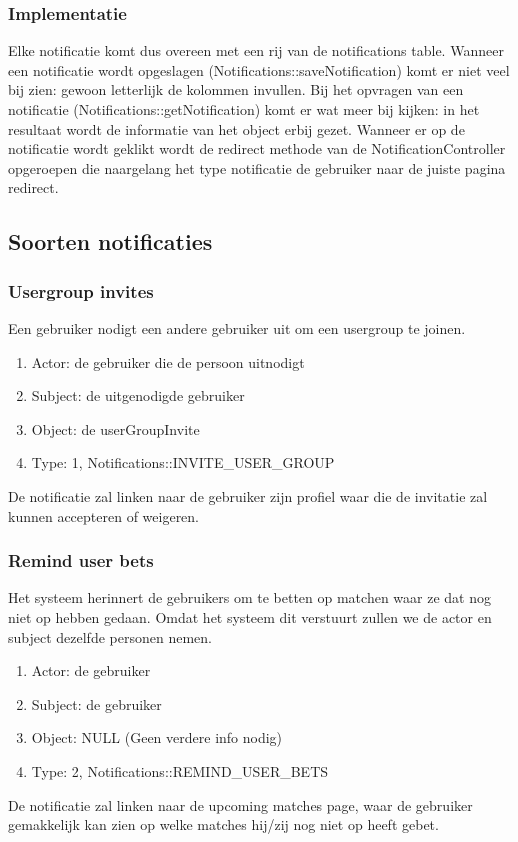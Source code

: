 \documentclass[11pt, a4paper]{article}
\begin{document}
\subsubsection{Implementatie}
Elke notificatie komt dus overeen met een rij van de notifications table. Wanneer een notificatie wordt opgeslagen (Notifications::saveNotification) komt er niet veel bij zien: gewoon letterlijk de kolommen invullen.
Bij het opvragen van een notificatie (Notifications::getNotification) komt er wat meer bij kijken: in het resultaat wordt de informatie van het object erbij gezet.
Wanneer er op de notificatie wordt geklikt wordt de redirect methode van de NotificationController opgeroepen die naargelang het type notificatie de gebruiker naar de juiste pagina redirect.

\subsection{Soorten notificaties}
\subsubsection{Usergroup invites}
Een gebruiker nodigt een andere gebruiker uit om een usergroup te joinen.
\begin{enumerate}
\item Actor: de gebruiker die de persoon uitnodigt
\item Subject: de uitgenodigde gebruiker
\item Object: de userGroupInvite
\item Type: 1, Notifications::INVITE_USER_GROUP
\end{enumerate}
De notificatie zal linken naar de gebruiker zijn profiel waar die de invitatie zal kunnen accepteren of weigeren.

\subsubsection{Remind user bets}
Het systeem herinnert de gebruikers om te betten op matchen waar ze dat nog niet op hebben gedaan.
Omdat het systeem dit verstuurt zullen we de actor en subject dezelfde personen nemen.
\begin{enumerate}
\item Actor: de gebruiker
\item Subject: de gebruiker
\item Object: NULL (Geen verdere info nodig)
\item Type: 2, Notifications::REMIND_USER_BETS
\end{enumerate}
De notificatie zal linken naar de upcoming matches page, waar de gebruiker gemakkelijk kan zien op welke matches hij/zij nog niet op heeft gebet.
\end{document}
